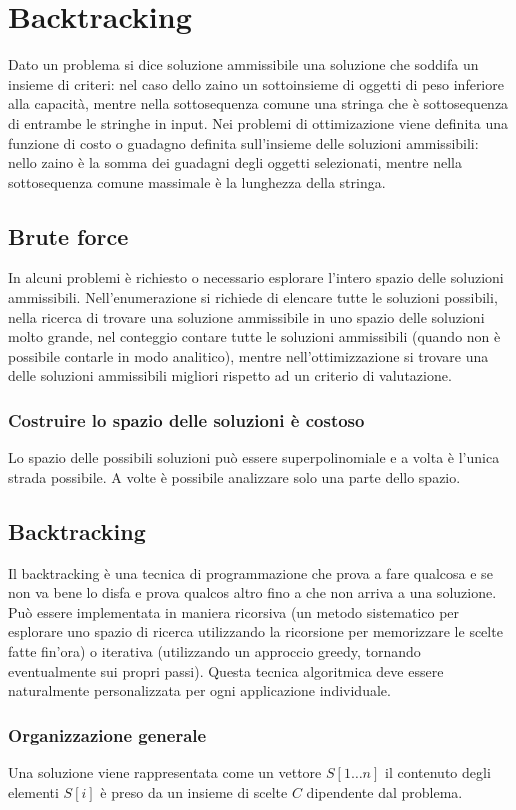 \chapter{Backtracking}
Dato un problema si dice soluzione ammissibile una soluzione che soddifa un insieme di criteri: nel caso dello zaino un sottoinsieme di oggetti di peso inferiore alla capacit\`a, mentre nella
sottosequenza comune una stringa che \`e sottosequenza di entrambe le stringhe in input. Nei problemi di ottimizazione viene definita una funzione di costo o guadagno definita 
sull'insieme delle soluzioni ammissibili: nello zaino \`e la somma dei guadagni degli oggetti selezionati, mentre nella sottosequenza comune massimale \`e la lunghezza della stringa.
\section{Brute force}
In alcuni problemi \`e richiesto o necessario esplorare l'intero spazio delle soluzioni ammissibili. Nell'enumerazione si richiede di elencare tutte le soluzioni possibili, nella ricerca
di trovare una soluzione ammissibile in uno spazio delle soluzioni molto grande, nel conteggio contare tutte le soluzioni ammissibili (quando non \`e possibile contarle in modo 
analitico), mentre nell'ottimizzazione si trovare una delle soluzioni ammissibili migliori rispetto ad un criterio di valutazione. 
\subsection{Costruire lo spazio delle soluzioni \`e costoso}
Lo spazio delle possibili soluzioni pu\`o essere superpolinomiale e a volta \`e l'unica strada possibile. A volte \`e possibile analizzare solo una parte dello spazio.
\section{Backtracking}
Il backtracking \`e una tecnica di programmazione che prova a fare qualcosa e se non va bene lo disfa e prova qualcos altro fino a che non arriva a una soluzione. Pu\`o essere 
implementata in maniera ricorsiva (un metodo sistematico per esplorare uno spazio di ricerca utilizzando la ricorsione per memorizzare le scelte fatte fin'ora) o iterativa (utilizzando
un approccio greedy, tornando eventualmente sui propri passi). Questa tecnica algoritmica deve essere naturalmente personalizzata per ogni applicazione individuale.
\subsection{Organizzazione generale}
Una soluzione viene rappresentata come un vettore $S[1\dots n]$ il contenuto degli elementi $S[i]$ \`e preso da un insieme di scelte $C$ dipendente dal problema.
